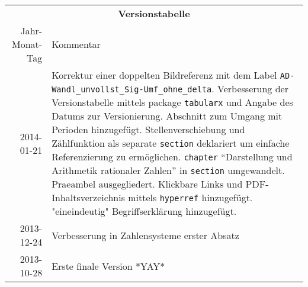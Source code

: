 \begin{table}[htp]
\centering
\begin{tabularx}{\columnwidth}{rp{}}
\multicolumn{2}{c}{\textbf{Versionstabelle}} \\
Jahr-Monat-Tag & Kommentar \\ \hline
2014-01-21 & Korrektur einer doppelten Bildreferenz mit dem Label \texttt{AD-Wandl\_unvollst\_Sig-Umf\_ohne\_delta}.  
Verbesserung der Versionstabelle mittels package \texttt{tabularx} und Angabe des Datums zur Versionierung. 
Abschnitt zum Umgang mit Perioden hinzugefügt. 
Stellenverschiebung und Zählfunktion als separate \texttt{section} deklariert um einfache Referenzierung zu ermöglichen.
\texttt{chapter} "`Darstellung und Arithmetik rationaler Zahlen"' in \texttt{section} umgewandelt. 
Praeambel ausgegliedert.
Klickbare Links und PDF-Inhaltsverzeichnis mittels \texttt{hyperref} hinzugefügt.
"eineindeutig" Begriffserklärung hinzugefügt.
\\
2013-12-24 & Verbesserung in Zahlensysteme erster Absatz \\
2013-10-28 & Erste finale Version *YAY* \\
\end{tabularx}
\end{table}